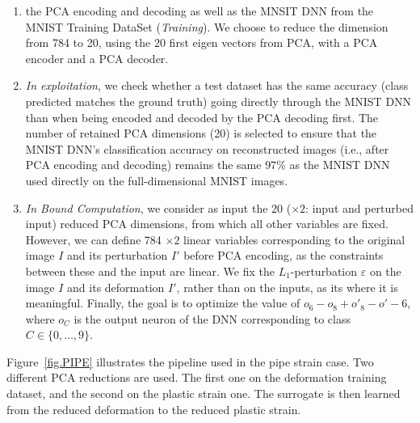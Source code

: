 \begin{enumerate}
\item  the PCA encoding and decoding as well as the MNSIT DNN from the MNIST Training DataSet ({\em Training}).
We choose to reduce the dimension from 784 to 20, using the 20 first eigen vectors from PCA, with a PCA encoder and a PCA decoder.

\item {\em In exploitation}, we check whether a test dataset has the same accuracy (class predicted matches the ground truth) 
going directly through the MNIST DNN than when being encoded and decoded by the PCA decoding first.
The number of retained PCA dimensions (20) is selected to ensure that the MNIST DNN's classification accuracy on reconstructed images (i.e., after PCA encoding and decoding) remains the same $97$\% as the MNIST DNN used directly on the full-dimensional MNIST images.
%
\item {\em In Bound Computation}, we consider as input the 20 ($\times 2$: input and perturbed input) reduced PCA dimensions, from which all other variables are fixed.
However, we can define 784 $\times 2$ linear variables corresponding to the original image $I$ and its perturbation $I'$ before PCA encoding, as the constraints between these and the input are linear.
We fix the $L_1$-perturbation $\varepsilon$ on the image $I$ and its deformation $I'$, rather than on the inputs, as its where it is meaningful.
Finally, the goal is to optimize the value of $o_6 -o_8+ o'_8 - o'-6$,  where $o_C$ is the output neuron of the DNN corresponding to class $C \in \{0,\ldots, 9\}$.
\end{enumerate}

%
%

\newpage


Figure~\ref{fig.PIPE} illustrates the pipeline used in the pipe strain case. 
Two different PCA reductions are used. The first one on the deformation training dataset, 
and the second on the plastic strain one.
%
The surrogate is then learned from the reduced deformation to the reduced plastic strain. 
%

